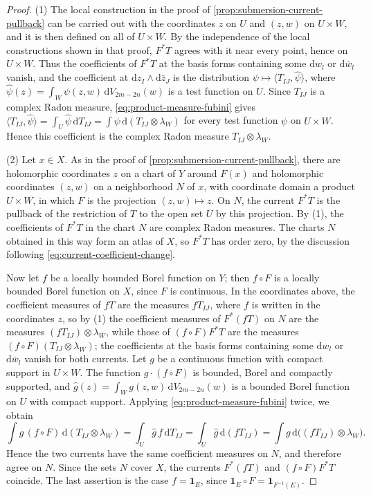 \begin{proof}
(1) The local construction in the proof of \cref{prop:submersion-current-pullback} can be carried out with the coordinates $z$ on $U$ and $(z,w)$ on $U\times W$, and it is then defined on all of $U\times W$. By the independence of the local constructions shown in that proof, $F^*T$ agrees with it near every point, hence on $U\times W$. Thus the coefficients of $F^*T$ at the basis forms containing some $\mathrm dw_l$ or $\mathrm d\bar w_l$ vanish, and the coefficient at $\mathrm dz_I\wedge\mathrm d\bar z_J$ is the distribution $\psi\mapsto\langle T_{IJ},\widehat\psi\rangle$, where $\widehat\psi(z)=\int_W\psi(z,w)\,\mathrm dV_{2m-2n}(w)$ is a test function on $U$. Since $T_{IJ}$ is a complex Radon measure, \eqref{eq:product-measure-fubini} gives $\langle T_{IJ},\widehat\psi\rangle=\int_U\widehat\psi\,\mathrm dT_{IJ}=\int\psi\,\mathrm d(T_{IJ}\otimes\lambda_W)$ for every test function $\psi$ on $U\times W$. Hence this coefficient is the complex Radon measure $T_{IJ}\otimes\lambda_W$.

(2) Let $x\in X$. As in the proof of \cref{prop:submersion-current-pullback}, there are holomorphic coordinates $z$ on a chart of $Y$ around $F(x)$ and holomorphic coordinates $(z,w)$ on a neighborhood $N$ of $x$, with coordinate domain a product $U\times W$, in which $F$ is the projection $(z,w)\mapsto z$. On $N$, the current $F^*T$ is the pullback of the restriction of $T$ to the open set $U$ by this projection. By (1), the coefficients of $F^*T$ in the chart $N$ are complex Radon measures. The charts $N$ obtained in this way form an atlas of $X$, so $F^*T$ has order zero, by the discussion following \eqref{eq:current-coefficient-change}.

Now let $f$ be a locally bounded Borel function on $Y$; then $f\circ F$ is a locally bounded Borel function on $X$, since $F$ is continuous. In the coordinates above, the coefficient measures of $fT$ are the measures $fT_{IJ}$, where $f$ is written in the coordinates $z$, so by (1) the coefficient measures of $F^*(fT)$ on $N$ are the measures $(fT_{IJ})\otimes\lambda_W$, while those of $(f\circ F)F^*T$ are the measures $(f\circ F)(T_{IJ}\otimes\lambda_W)$; the coefficients at the basis forms containing some $\mathrm dw_l$ or $\mathrm d\bar w_l$ vanish for both currents. Let $g$ be a continuous function with compact support in $U\times W$. The function $g\cdot(f\circ F)$ is bounded, Borel and compactly supported, and $\widehat g(z)=\int_Wg(z,w)\,\mathrm dV_{2m-2n}(w)$ is a bounded Borel function on $U$ with compact support. Applying \eqref{eq:product-measure-fubini} twice, we obtain
\[
 \int g\,(f\circ F)\,\mathrm d(T_{IJ}\otimes\lambda_W)=\int_U\widehat g\,f\,\mathrm dT_{IJ}=\int_U\widehat g\,\mathrm d(fT_{IJ})=\int g\,\mathrm d\bigl((fT_{IJ})\otimes\lambda_W\bigr).
\]
Hence the two currents have the same coefficient measures on $N$, and therefore agree on $N$. Since the sets $N$ cover $X$, the currents $F^*(fT)$ and $(f\circ F)F^*T$ coincide. The last assertion is the case $f=\mathbf 1_E$, since $\mathbf 1_E\circ F=\mathbf 1_{F^{-1}(E)}$.
\end{proof}

